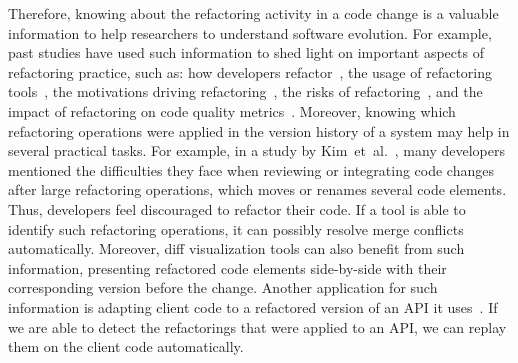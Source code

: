 Therefore, knowing about the refactoring activity in a code change is a valuable information to help researchers to understand software evolution.
For example, past studies have used such information to shed light on important aspects of refactoring practice, such as: how developers refactor~\cite{MurphyHill2012}, the usage of refactoring tools~\cite{negara2013, MurphyHill2012}, the motivations driving refactoring~\cite{Kim:2012:FSE, kim-tse-2014, fse2016-why-we-refactor}, the risks of refactoring~\cite{Kim:2012:FSE, kim-tse-2014, Kim:2011, weissgerber2006refactorings, bavota2012does}, and the impact of refactoring on code quality metrics~\cite{Kim:2012:FSE, kim-tse-2014}.
Moreover, knowing which refactoring operations were applied in the version history of a system may help in several practical tasks.
For example, in a study by Kim~et~al.~\cite{Kim:2012:FSE}, many developers mentioned the difficulties they face when reviewing or integrating code changes after large refactoring operations, which moves or renames several code elements. Thus, developers feel discouraged to refactor their code. If a tool is able to identify such refactoring operations, it can possibly resolve merge conflicts automatically. 
Moreover, diff visualization tools can also benefit from such information, presenting refactored code elements side-by-side with their corresponding version before the change.
Another application for such information is adapting client code to a refactored version of an API it uses~\cite{henkel2005catchup, Xing:2008:JDevAn}. If we are able to detect the refactorings that were applied to an API, we can replay them on the client code automatically.


